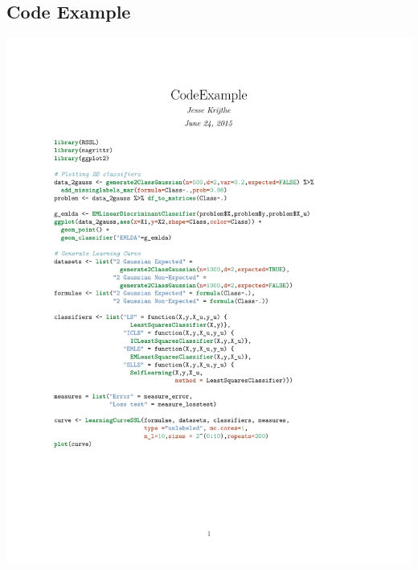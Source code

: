 \documentclass[final]{beamer}
\begin{document}
\begin{frame}[t]
\begin{multicols}{3}
\section{Code Example}
\includegraphics[width=0.90\columnwidth]{examplecode.pdf}
\vfill
\bigskip
\bigskip

\end{multicols}
\end{frame}
\end{document}
